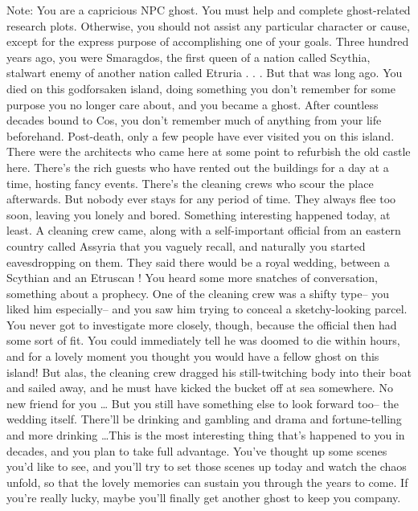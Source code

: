 \documentclass[char]{Kos}
\begin{document}
\name{\cEmeraldQueen{}}

	Note: You are a capricious NPC ghost. You must help \cAnarchist{} and \cButler{} complete ghost-related research plots. Otherwise, you should not assist any particular character or cause, except for the express purpose of accomplishing one of your goals.
	Three hundred years ago, you were Smaragdos, the first queen of a nation called Scythia, stalwart enemy of another nation called Etruria . . . But that was long ago. You died on this godforsaken island, doing something you don't remember for some purpose you no longer care about, and you became a ghost. After countless decades bound to Cos, you don't remember much of anything from your life beforehand.
	 Post-death, only a few people have ever visited you on this island. There were the architects who came here at some point to refurbish the old castle here. There's the rich guests who have rented out the buildings for a day at a time, hosting fancy events. There's the cleaning crews who scour the place afterwards. But nobody ever stays for any period of time. They always flee too soon, leaving you lonely and bored.
	 Something interesting happened today, at least. A cleaning crew came, along with a self-important official from an eastern country called Assyria that you vaguely recall, and naturally you started eavesdropping on them. They said there would be a royal wedding, between a Scythian \cBride{\prince} and an Etruscan \cGroom{\prince}! You heard some more snatches of conversation, something about a prophecy. One of the cleaning crew was a shifty type-- you liked him especially-- and you saw him trying to conceal a sketchy-looking parcel. You never got to investigate more closely, though, because the official then had some sort of fit. You could immediately tell he was doomed to die within hours, and for a lovely moment you thought you would have a fellow ghost on this island! But alas, the cleaning crew dragged his still-twitching body into their boat and sailed away, and he must have kicked the bucket off at sea somewhere. No new friend for you \ldots
	 But you still have something else to look forward too-- the wedding itself. There'll be drinking and gambling and drama and fortune-telling and more drinking \ldots This is the most interesting thing that's happened to you in decades, and you plan to take full advantage. You've thought up some scenes you'd like to see, and you'll try to set those scenes up today and watch the chaos unfold, so that the lovely memories can sustain you through the years to come.
	 If you're really lucky, maybe you'll finally get another ghost to keep you company.
\end{document}
